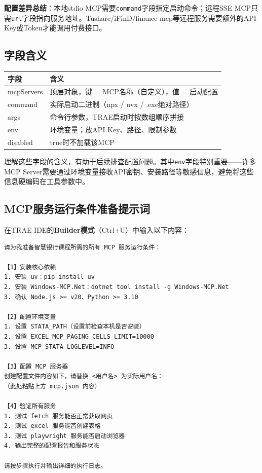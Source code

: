 \textbf{配置差异总结}：本地stdio MCP需要\texttt{command}字段指定启动命令；远程SSE MCP只需\texttt{url}字段指向服务地址。Tushare/iFinD/finance-mcp等远程服务需要额外的API Key或Token才能调用付费接口。

\subsection{字段含义}

\begin{table}[H]
\centering
\begin{tabular}{lp{10cm}}
\toprule
\textbf{字段} & \textbf{含义} \\
\midrule
mcpServers & 顶层对象，键 = MCP名称（自定义），值 = 启动配置 \\
command & 实际启动二进制（npx / uvx / .exe绝对路径） \\
args & 命令行参数，TRAE启动时按数组顺序拼接 \\
env & 环境变量；放API Key、路径、限制参数 \\
disabled & true时不加载该MCP \\
\bottomrule
\end{tabular}
\end{table}

理解这些字段的含义，有助于后续排查配置问题。其中\texttt{env}字段特别重要——许多MCP Server需要通过环境变量接收API密钥、安装路径等敏感信息，避免将这些信息硬编码在工具参数中。

\subsection{MCP服务运行条件准备提示词}

在TRAE IDE的\textbf{Builder模式}（Ctrl+U）中输入以下内容：

\begin{lstlisting}
请为我准备智慧银行课程所需的所有 MCP 服务运行条件：

【1】安装核心依赖
1. 安装 uv：pip install uv
2. 安装 Windows-MCP.Net：dotnet tool install -g Windows-MCP.Net
3. 确认 Node.js >= v20、Python >= 3.10

【2】配置环境变量
1. 设置 STATA_PATH（设置前检查本机是否安装）
2. 设置 EXCEL_MCP_PAGING_CELLS_LIMIT=10000
3. 设置 MCP_STATA_LOGLEVEL=INFO

【3】配置 MCP 服务器
创建配置文件内容如下，请替换 <用户名> 为实际用户名：
（此处粘贴上方 mcp.json 内容）

【4】验证所有服务
1. 测试 fetch 服务能否正常获取网页
2. 测试 excel 服务能否创建表格
3. 测试 playwright 服务能否启动浏览器
4. 输出完整的配置报告和服务状态

请按步骤执行并输出详细的执行日志。
\end{lstlisting}

